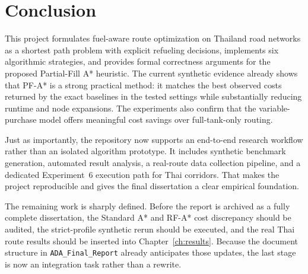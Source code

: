 \chapter{Conclusion}
\label{ch:conclusion}

This project formulates fuel-aware route optimization on Thailand road networks as a shortest
path problem with explicit refueling decisions, implements six algorithmic strategies, and
provides formal correctness arguments for the proposed Partial-Fill A* heuristic.
The current synthetic evidence already shows that PF-A* is a strong practical method: it
matches the best observed costs returned by the exact baselines in the tested settings while
substantially reducing runtime and node expansions.
The experiments also confirm that the variable-purchase model offers meaningful cost savings
over full-tank-only routing.

Just as importantly, the repository now supports an end-to-end research workflow rather than
an isolated algorithm prototype.
It includes synthetic benchmark generation, automated result analysis, a real-route data
collection pipeline, and a dedicated Experiment~6 execution path for Thai corridors.
That makes the project reproducible and gives the final dissertation a clear empirical
foundation.

The remaining work is sharply defined.
Before the report is archived as a fully complete dissertation, the Standard A* and RF-A*
cost discrepancy should be audited, the strict-profile synthetic rerun should be executed, and
the real Thai route results should be inserted into Chapter~\ref{ch:results}.
Because the document structure in \texttt{ADA\_Final\_Report} already anticipates those
updates, the last stage is now an integration task rather than a rewrite.
